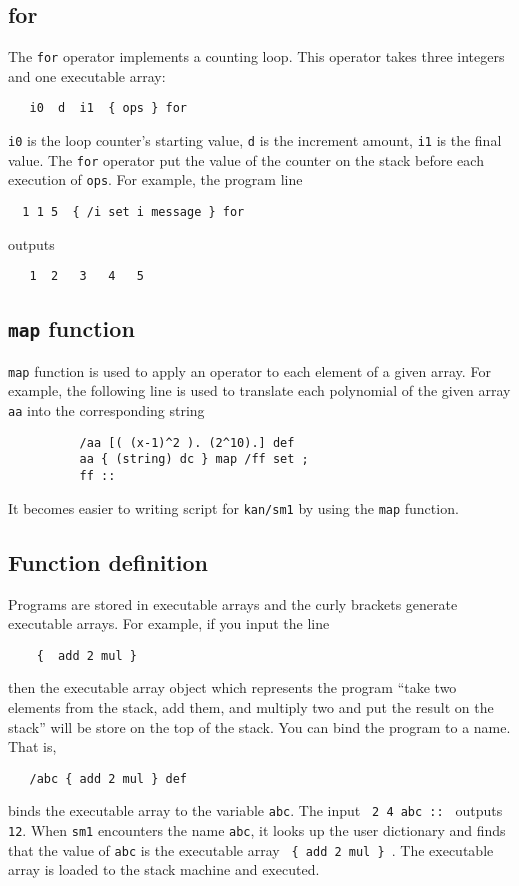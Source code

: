\documentclass{article}
\begin{document}
\subsection{for}
The {\tt for} operator implements a counting loop.
This operator takes three integers and one executable array:
\begin{verbatim}
   i0  d  i1  { ops } for
\end{verbatim}
{\tt i0} is the loop counter's starting value,
{\tt d} is the increment amount,
{\tt i1} is the final value.
The {\tt for} operator put the value of the counter on the stack before
each execution of {\tt ops}.
For example, the program line
\begin{verbatim}
  1 1 5  { /i set i message } for
\end{verbatim}
outputs
\begin{verbatim}
   1  2   3   4   5 
\end{verbatim}



\subsection{{\tt map} function}

{\tt map} function is used to apply an operator to each element
of a given array.
For example, the following line is used to translate each polynomial
of the given array {\tt aa} into the corresponding string
\begin{verbatim}
          /aa [( (x-1)^2 ). (2^10).] def
          aa { (string) dc } map /ff set ;
          ff ::
\end{verbatim}
It becomes easier to writing script for {\tt kan/sm1} by using the {\tt map}
function.

\subsection{Function definition}

Programs are stored in executable arrays and
the curly brackets generate executable arrays.
For example, if you input the line
\begin{verbatim}
    {  add 2 mul }
\end{verbatim}
then the executable array object which represents the program
``take two elements from the stack, add them, and multiply two 
and put the result on the stack''
will be store on the top of the stack.
You can bind the program to a name.
That is, 
\begin{verbatim}
   /abc { add 2 mul } def
\end{verbatim}
binds the executable array to the variable {\tt abc}.
The input \verb+ 2 4 abc :: + outputs {\tt 12}.
When {\tt sm1} encounters the name {\tt abc},
it looks up the user dictionary and finds that
the value of {\tt abc} is the executable array
\verb+ { add 2 mul } +.
The executable array is loaded to the stack machine and
executed.
\end{document}
